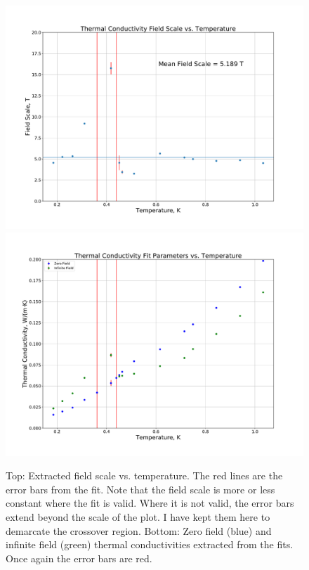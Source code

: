 \documentclass{thesis-umich}
\begin{document}
\begin{figure}
	\centering
	\caption[SCBO Fitting Parameters vs. Temperature]{Top: Extracted field scale vs. temperature. The red lines are the error bars from the fit. Note that the field scale is more or less constant where the fit is valid. Where it is not valid, the error bars extend beyond the scale of the plot. I have kept them here to demarcate the crossover region. Bottom: Zero field (blue) and infinite field (green) thermal conductivities extracted from the fits. Once again the error bars are red.}
	\label{fig:SCBO_fit_params}
	\centering
	\includegraphics[width=0.85\columnwidth,trim={1cm 1cm 1cm 1cm},clip]{figures/SCBO_field_scale.pdf}
	\includegraphics[width=0.85\columnwidth,trim={1cm 1cm 1cm 1cm},clip]{figures/SCBO_tcond_params.pdf}
\end{figure}
\end{document}
